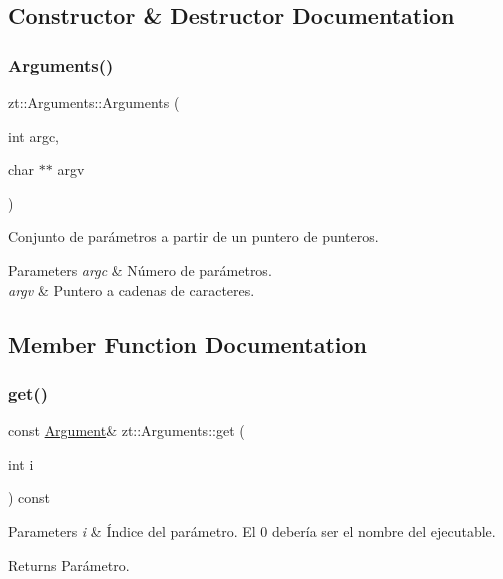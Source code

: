 \subsection{Constructor \& Destructor Documentation}
\mbox{\label{classzt_1_1_arguments_a808eb391686c72c4196f4cf59610f427}} 
\subsubsection{\texorpdfstring{Arguments()}{Arguments()}}
{\footnotesize\ttfamily zt\+::\+Arguments\+::\+Arguments (\begin{DoxyParamCaption}\item[{int}]{argc,  }\item[{char $\ast$$\ast$}]{argv }\end{DoxyParamCaption})}



Conjunto de parámetros a partir de un puntero de punteros. 


\begin{DoxyParams}{Parameters}
{\em argc} & Número de parámetros. \\
\hline
{\em argv} & Puntero a cadenas de caracteres. \\
\hline
\end{DoxyParams}


\subsection{Member Function Documentation}
\mbox{\label{classzt_1_1_arguments_a0b71f588f3af4e114149773af8f31c2e}} 
\subsubsection{\texorpdfstring{get()}{get()}}
{\footnotesize\ttfamily const \hyperlink{classzt_1_1_argument}{Argument}\& zt\+::\+Arguments\+::get (\begin{DoxyParamCaption}\item[{int}]{i }\end{DoxyParamCaption}) const}


\begin{DoxyParams}{Parameters}
{\em i} & Índice del parámetro. El 0 debería ser el nombre del ejecutable. \\
\hline
\end{DoxyParams}
\begin{DoxyReturn}{Returns}
Parámetro. 
\end{DoxyReturn}
\mbox{\label{classzt_1_1_arguments_aee2e1c74257bd3a11d34edb1898341dc}} 
